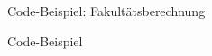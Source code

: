 \begin{slide}{Code-Beispiel: Fakultätsberechnung}
	
\end{slide}

\begin{slide}{Code-Beispiel}
	
\end{slide}
